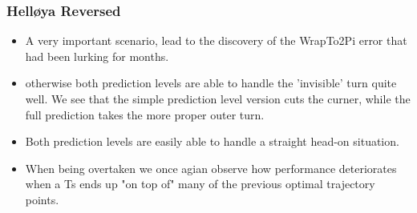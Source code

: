 \subsubsection{Helløya Reversed}
\begin{itemize}
    \item A very important scenario, lead to the discovery of the WrapTo2Pi error that had been lurking for months.
    \item otherwise both prediction levels are able to handle the 'invisible' turn quite well. We see that the simple prediction level
    version cuts the curner, while the full prediction takes the more proper outer turn.
    \item Both prediction levels are easily able to handle a straight head-on situation.
    \item When being overtaken we once agian observe how performance deteriorates when a \gls{Ts} ends up "on top of"
    many of the previous optimal trajectory points.
\end{itemize}


